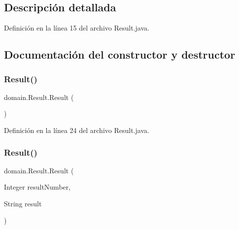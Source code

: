 \subsection{Descripción detallada}


Definición en la línea 15 del archivo Result.\+java.



\subsection{Documentación del constructor y destructor}
\mbox{\label{classdomain_1_1Result_a0ad4f30f5b6195abe95e2a491ee067e9}} 
\subsubsection{\texorpdfstring{Result()}{Result()}\hspace{0.1cm}{\footnotesize\ttfamily [1/2]}}
{\footnotesize\ttfamily domain.\+Result.\+Result (\begin{DoxyParamCaption}{ }\end{DoxyParamCaption})}



Definición en la línea 24 del archivo Result.\+java.


\begin{DoxyCode}{0}

\end{DoxyCode}
\mbox{\label{classdomain_1_1Result_a8f778bfb79029a4cb7930fb9f1f642fd}} 
\subsubsection{\texorpdfstring{Result()}{Result()}\hspace{0.1cm}{\footnotesize\ttfamily [2/2]}}
{\footnotesize\ttfamily domain.\+Result.\+Result (\begin{DoxyParamCaption}\item[{Integer}]{result\+Number,  }\item[{String}]{result }\end{DoxyParamCaption})}



